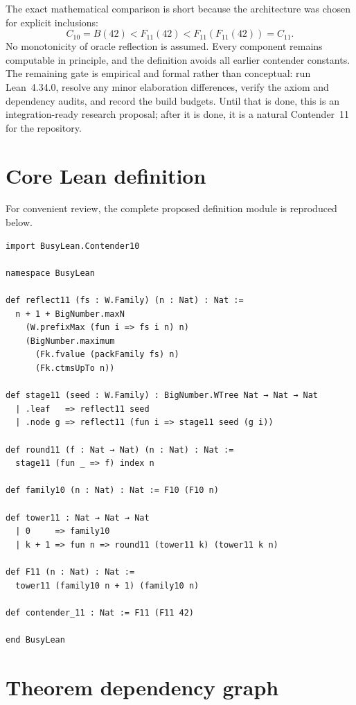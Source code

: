 \documentclass[11pt]{article}
\theoremstyle{definition}
\theoremstyle{remark}
\newcommand{\Cten}{C_{10}}
\newcommand{\Celeven}{C_{11}}
\newcommand{\Bfam}{B}
\begin{document}
The exact mathematical comparison is short because the architecture was chosen
for explicit inclusions:
\[
  \Cten=\Bfam(42)
  <F_{11}(42)
  <F_{11}(F_{11}(42))=\Celeven.
\]
No monotonicity of oracle reflection is assumed. Every component remains
computable in principle, and the definition avoids all earlier contender
constants. The remaining gate is empirical and formal rather than conceptual:
run Lean~4.34.0, resolve any minor elaboration differences, verify the axiom and
dependency audits, and record the build budgets. Until that is done, this is an
integration-ready research proposal; after it is done, it is a natural
Contender~11 for the repository.

\appendix
\section{Core Lean definition}

For convenient review, the complete proposed definition module is reproduced
below.

\begin{lstlisting}
import BusyLean.Contender10

namespace BusyLean

def reflect11 (fs : W.Family) (n : Nat) : Nat :=
  n + 1 + BigNumber.maxN
    (W.prefixMax (fun i => fs i n) n)
    (BigNumber.maximum
      (Fk.fvalue (packFamily fs) n)
      (Fk.ctmsUpTo n))

def stage11 (seed : W.Family) : BigNumber.WTree Nat → Nat → Nat
  | .leaf   => reflect11 seed
  | .node g => reflect11 (fun i => stage11 seed (g i))

def round11 (f : Nat → Nat) (n : Nat) : Nat :=
  stage11 (fun _ => f) index n

def family10 (n : Nat) : Nat := F10 (F10 n)

def tower11 : Nat → Nat → Nat
  | 0     => family10
  | k + 1 => fun n => round11 (tower11 k) (tower11 k n)

def F11 (n : Nat) : Nat :=
  tower11 (family10 n + 1) (family10 n)

def contender_11 : Nat := F11 (F11 42)

end BusyLean
\end{lstlisting}

\section{Theorem dependency graph}
\end{document}
